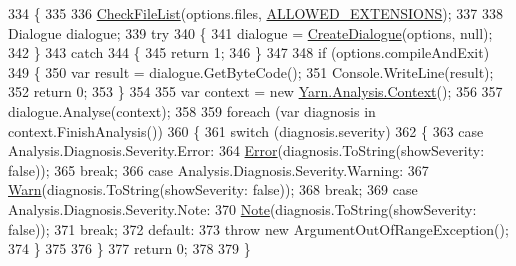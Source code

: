 \begin{DoxyCode}
334         \{
335 
336             \hyperlink{a00171_ad77564b25725a771f0fd4da430582e6f}{CheckFileList}(options.files, \hyperlink{a00171_a0979de7ea02c8c0375b8220a12e6575e}{ALLOWED\_EXTENSIONS});
337 
338             Dialogue dialogue;
339             \textcolor{keywordflow}{try}
340             \{
341                 dialogue = \hyperlink{a00171_aab244361a510cee18ad2f636d110e0d5}{CreateDialogue}(options, null);
342             \}
343             \textcolor{keywordflow}{catch}
344             \{
345                 \textcolor{keywordflow}{return} 1;
346             \}
347 
348             \textcolor{keywordflow}{if} (options.compileAndExit)
349             \{
350                 var result = dialogue.GetByteCode();
351                 Console.WriteLine(result);
352                 \textcolor{keywordflow}{return} 0;
353             \}
354 
355             var context = \textcolor{keyword}{new} \hyperlink{a00037}{Yarn.Analysis.Context}();
356 
357             dialogue.Analyse(context);
358 
359             \textcolor{keywordflow}{foreach} (var diagnosis \textcolor{keywordflow}{in} context.FinishAnalysis())
360             \{
361                 \textcolor{keywordflow}{switch} (diagnosis.severity)
362                 \{
363                     \textcolor{keywordflow}{case} Analysis.Diagnosis.Severity.Error:
364                         \hyperlink{a00171_a2f63f9f5b7634cb50ee75ff2eb18b137}{Error}(diagnosis.ToString(showSeverity: \textcolor{keyword}{false}));
365                         \textcolor{keywordflow}{break};
366                     \textcolor{keywordflow}{case} Analysis.Diagnosis.Severity.Warning:
367                         \hyperlink{a00171_a979bb6f049b6c5294f745a19e24ddd9d}{Warn}(diagnosis.ToString(showSeverity: \textcolor{keyword}{false}));
368                         \textcolor{keywordflow}{break};                      
369                     \textcolor{keywordflow}{case} Analysis.Diagnosis.Severity.Note:
370                         \hyperlink{a00171_a939cc9e943c574b36c6af93e9c772702}{Note}(diagnosis.ToString(showSeverity: \textcolor{keyword}{false}));
371                         \textcolor{keywordflow}{break};
372                     \textcolor{keywordflow}{default}:
373                         \textcolor{keywordflow}{throw} \textcolor{keyword}{new} ArgumentOutOfRangeException();
374                 \}
375 
376             \}
377             \textcolor{keywordflow}{return} 0;
378 
379         \}
\end{DoxyCode}
